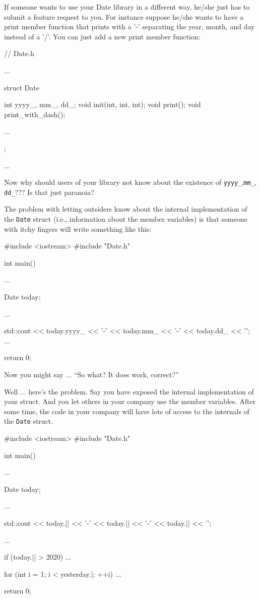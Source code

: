 If someone wants to use your Date library in a different way, he/she just
has to submit a feature request to you. For instance suppose he/she
wants to have a print member function that prints with a '-' separating the
year, month, and day instead of a '/'. You can just add a new print
member function:
\begin{consolethree}
// Date.h

...

struct Date
{
    int yyyy_, mm_, dd_;
    void init(int, int, int);
    void print();
    void print_with_dash();

    ...
};

...
\end{consolethree}
Now why should users of your library not know about the existence of \texttt{yyyy\_},\texttt{mm\_}, \texttt{dd\_}??? Is that just paranoia?

The problem with letting outsiders know about the internal
implementation of the \texttt{Date} struct (i.e., information about the
member variables) is that someone with itchy fingers will write
something like this:

\begin{consolethree}[escapeinside=||]
#include <iostream>
#include "Date.h"

int main()
{
    ...
    
    Date today;

    ...

    std::cout << today.yyyy_ << '-'
              << today.mm_ << '-'
              << today.dd_ << '\n';
    ...

    return 0;
}
\end{consolethree}

Now you might say ... ``So what? It does work, correct?''

Well ... here's the problem. Say you have exposed
the internal implementation of your struct. And you let others in your
company use the member variables. After some time, the code in your
company will have lots of access to the internals of the \texttt{Date}
struct.

\begin{consolethree}[escapeinside=||]
#include <iostream>
#include "Date.h"

int main()
{
    ...

    Date today;

    ...

    std::cout << today.|| << '-'
              << today.|| << '-'
              << today.|| << '\n';

    ...
    
    if (today.|| > 2020)
    {
        ...
    }

    for (int i = 1; i < yesterday.|; ++i)
    {
        ...
    }

    return 0;
}
\end{consolethree}

